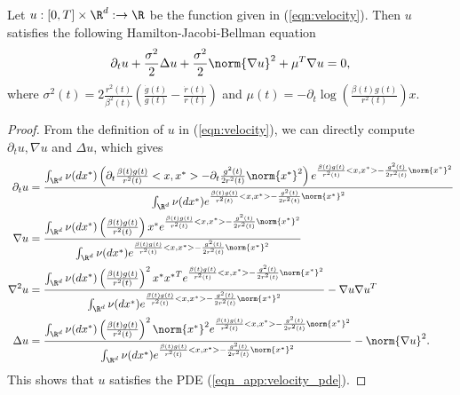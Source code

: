 \begin{lemma}\label{lemma_app_app:velociyt_HJB_PDE}
    Let $u:[0,T]\times\R^d:\rightarrow\R$ be the function given in (\ref{eqn:velocity}). Then $u$ satisfies the following Hamilton-Jacobi-Bellman equation
\begin{equation}\label{eqn_app:velocity_pde}
    \partial_t u + \frac{\sigma^2}{2}\Delta u + \frac{\sigma^2}{2}\norm{\nabla u}^2+\mu^T\nabla u = 0,
\end{equation}
where $\sigma^2(t) = 2\frac{r^2(t)}{\beta^2(t)}\left(\frac{\dot g(t)}{g(t)}-\frac{\dot r(t)}{r(t)}\right)$ and $\mu(t)= - \partial_t\log\left(\frac{\beta(t)g(t)}{r^2(t)}\right)x$.
\end{lemma}
\begin{proof}
    From the definition of $u$ in (\ref{eqn:velocity}), we can directly compute $\partial_tu, \nabla u$ and $\Delta u$, which gives
    \begin{align*}
        \partial_t u &= \frac{\int_{\R^d}\nu(dx^*)\left(\partial_t\frac{\beta(t)g(t)}{r^2(t)}<x,x^*>-\partial_t\frac{g^2(t)}{2r^2(t)}\norm{x^*}^2\right)e^{\frac{\beta(t)g(t)}{r^2(t)}<x,x^*>-\frac{g^2(t)}{2r^2(t)}\norm{x^*}^2}}{\int_{\R^d}\nu(dx^*)e^{\frac{\beta(t)g(t)}{r^2(t)}<x,x^*>-\frac{g^2(t)}{2r^2(t)}\norm{x^*}^2}}\\
        \nabla u &= \frac{\int_{\R^d}\nu(dx^*)\left(\frac{\beta(t)g(t)}{r^2(t)}\right)x^*e^{\frac{\beta(t)g(t)}{r^2(t)}<x,x^*>-\frac{g^2(t)}{2r^2(t)}\norm{x^*}^2}}{\int_{\R^d}\nu(dx^*)e^{\frac{\beta(t)g(t)}{r^2(t)}<x,x^*>-\frac{g^2(t)}{2r^2(t)}\norm{x^*}^2}}\\
        \nabla^2 u &= \frac{\int_{\R^d}\nu(dx^*)\left(\frac{\beta(t)g(t)}{r^2(t)}\right)^2x^*{x^*}^Te^{\frac{\beta(t)g(t)}{r^2(t)}<x,x^*>-\frac{g^2(t)}{2r^2(t)}\norm{x^*}^2}}{\int_{\R^d}\nu(dx^*)e^{\frac{\beta(t)g(t)}{r^2(t)}<x,x^*>-\frac{g^2(t)}{2r^2(t)}\norm{x^*}^2}}-\nabla u\nabla u^T\\
        \Delta u &= \frac{\int_{\R^d}\nu(dx^*)\left(\frac{\beta(t)g(t)}{r^2(t)}\right)^2\norm{x^*}^2e^{\frac{\beta(t)g(t)}{r^2(t)}<x,x^*>-\frac{g^2(t)}{2r^2(t)}\norm{x^*}^2}}{\int_{\R^d}\nu(dx^*)e^{\frac{\beta(t)g(t)}{r^2(t)}<x,x^*>-\frac{g^2(t)}{2r^2(t)}\norm{x^*}^2}}-\norm{\nabla u}^2.
    \end{align*}
This shows that $u$ satisfies the PDE (\ref{eqn_app:velocity_pde}).
\end{proof}

